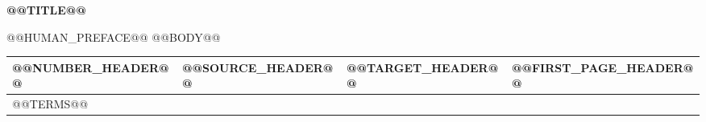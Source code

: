 \documentclass[a5paper,twoside,openany,10pt,fontset=fandol]{ctexbook}
\begin{document}
\begin{center}{\Large\bfseries @@TITLE@@\par}\end{center}
\clearpage
@@HUMAN_PREFACE@@
@@BODY@@
\clearpage
{}
\small
\newlength{\BTTableWidth}
\setlength{\BTTableWidth}{\dimexpr\textwidth-6\tabcolsep\relax}
\begin{longtable}{@{}>{\raggedleft\arraybackslash\BTTableCell}p{.08\BTTableWidth} >{\raggedright\arraybackslash\BTTableCell}p{.32\BTTableWidth} >{\raggedright\arraybackslash\BTTableCell}p{.34\BTTableWidth} >{\raggedleft\arraybackslash\BTTableCell}p{.26\BTTableWidth}@{}}
\textbf{@@NUMBER_HEADER@@}&\textbf{@@SOURCE_HEADER@@}&\textbf{@@TARGET_HEADER@@}&\textbf{@@FIRST_PAGE_HEADER@@}\\\hline
\endhead
@@TERMS@@
\end{longtable}
\end{document}
